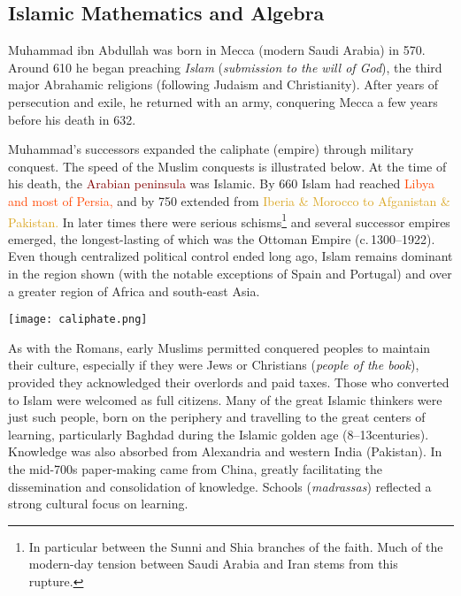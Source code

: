 \clearpage

\subsection{Islamic Mathematics and Algebra}\label{sec:islamalgebra}

Muhammad ibn Abdullah was born in Mecca (modern Saudi Arabia) in 570. Around 610 he began preaching \emph{Islam} (\emph{submission to the will of God}), the third major Abrahamic religions (following Judaism and Christianity). After years of persecution and exile, he returned with an army, conquering Mecca a few years before his death in 632.\smallbreak

Muhammad's successors expanded the caliphate (empire) through military conquest. The speed of the Muslim conquests is illustrated below. At the time of his death, the \textcolor{Maroon}{Arabian peninsula} was Islamic. By 660 Islam had reached \textcolor{OrangeRed}{Libya and most of Persia,} and by 750 extended from \textcolor{Goldenrod}{Iberia \& Morocco to Afganistan \& Pakistan.} In later times there were serious schisms\footnote{In particular between the Sunni and Shia branches of the faith. Much of the modern-day tension between Saudi Arabia and Iran stems from this rupture.} and several successor empires emerged, the longest-lasting of which was the Ottoman Empire (c.\,1300--1922). Even though centralized political control ended long ago, Islam remains dominant in the region shown (with the notable exceptions of Spain and Portugal) and over a greater region of Africa and south-east Asia.
\begin{center}
	\texttt{[image: caliphate.png]}
\end{center}

As with the Romans, early Muslims permitted conquered peoples to maintain their culture, especially if they were Jews or Christians (\emph{people of the book}), provided they acknowledged their overlords and paid taxes. Those who converted to Islam were welcomed as full citizens. Many of the great Islamic thinkers were just such people, born on the periphery and travelling to the great centers of learning, particularly Baghdad during the Islamic golden age (8\th--13\th centuries). Knowledge was also absorbed from Alexandria and western India (Pakistan). In the mid-700s paper-making came from China, greatly facilitating the dissemination and consolidation of knowledge. Schools (\emph{madrassas}) reflected a strong cultural focus on learning.\smallbreak


